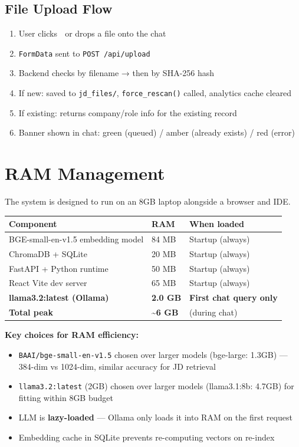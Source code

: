 \documentclass[12pt, a4paper]{article}
\begin{document}
\subsection{File Upload Flow}

\begin{enumerate}[noitemsep]
    \item User clicks 📎 or drops a file onto the chat
    \item \texttt{FormData} sent to \texttt{POST /api/upload}
    \item Backend checks by filename → then by SHA-256 hash
    \item If new: saved to \texttt{jd\_files/}, \texttt{force\_rescan()} called, analytics cache cleared
    \item If existing: returns company/role info for the existing record
    \item Banner shown in chat: green (queued) / amber (already exists) / red (error)
\end{enumerate}

\section{RAM Management}

The system is designed to run on an 8GB laptop alongside a browser and IDE.

\begin{tabularx}{\textwidth}{lll}
\toprule
\textbf{Component} & \textbf{RAM} & \textbf{When loaded} \\
\midrule
BGE-small-en-v1.5 embedding model & 84 MB  & Startup (always) \\
ChromaDB + SQLite                 & 20 MB  & Startup (always) \\
FastAPI + Python runtime          & 50 MB  & Startup (always) \\
React Vite dev server             & 65 MB  & Startup (always) \\
\textbf{llama3.2:latest (Ollama)} & \textbf{2.0 GB} & \textbf{First chat query only} \\
\midrule
\textbf{Total peak}               & \textbf{\textasciitilde 6 GB} & (during chat) \\
\bottomrule
\end{tabularx}

\textbf{Key choices for RAM efficiency:}
\begin{itemize}[noitemsep]
    \item \texttt{BAAI/bge-small-en-v1.5} chosen over larger models (bge-large: 1.3GB) --- 384-dim vs 1024-dim, similar accuracy for JD retrieval
    \item \texttt{llama3.2:latest} (2GB) chosen over larger models (llama3.1:8b: 4.7GB) for fitting within 8GB budget
    \item LLM is \textbf{lazy-loaded} --- Ollama only loads it into RAM on the first request
    \item Embedding cache in SQLite prevents re-computing vectors on re-index
\end{itemize}
\end{document}
